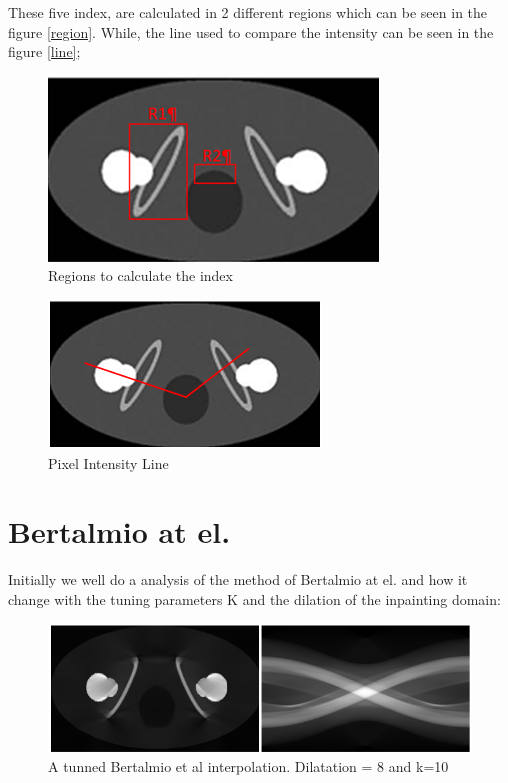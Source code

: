 These five index, are calculated in 2 different regions which can be seen in the figure \eqref{region}. While, the line used to compare the intensity can be seen in the figure \eqref{line};

\begin{figure}[h]
\centering
\includegraphics[scale=0.64]{img/region}
\caption{{Regions to calculate the index}}\label{region}
\end{figure}

\begin{figure}[h]
\centering
\includegraphics[scale=0.79]{img/line}
\caption{{Pixel Intensity Line}}\label{line}
\end{figure}

\section{Bertalmio at el.}
Initially we well do a analysis of the method of Bertalmio at el. and how it change with the tuning parameters K and the dilation of the inpainting domain:

\begin{figure}[h]
\centering
\includegraphics[scale=0.7]{img/bertalmio_basic}
\caption{{A tunned Bertalmio et al interpolation. Dilatation = 8 and k=10}}\label{bertalmio_basic}
\end{figure}

